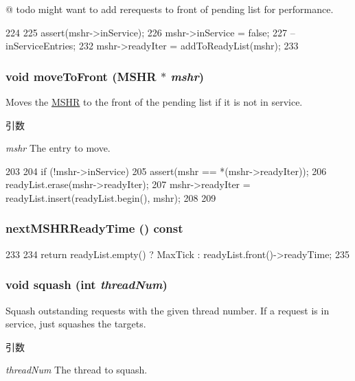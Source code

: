 @ todo might want to add rerequests to front of pending list for performance.


\begin{DoxyCode}
224 {
225     assert(mshr->inService);
226     mshr->inService = false;
227     --inServiceEntries;
232     mshr->readyIter = addToReadyList(mshr);
233 }
\end{DoxyCode}
\hypertarget{classMSHRQueue_a2a53c836e41157cdbf2c19b6fd30e276}{
\subsubsection[{moveToFront}]{\setlength{\rightskip}{0pt plus 5cm}void moveToFront ({\bf MSHR} $\ast$ {\em mshr})}}
\label{classMSHRQueue_a2a53c836e41157cdbf2c19b6fd30e276}
Moves the \hyperlink{classMSHR}{MSHR} to the front of the pending list if it is not in service. 
\begin{DoxyParams}{引数}
\item[{\em mshr}]The entry to move. \end{DoxyParams}



\begin{DoxyCode}
203 {
204     if (!mshr->inService) {
205         assert(mshr == *(mshr->readyIter));
206         readyList.erase(mshr->readyIter);
207         mshr->readyIter = readyList.insert(readyList.begin(), mshr);
208     }
209 }
\end{DoxyCode}
\hypertarget{classMSHRQueue_a4601a57ba7740776052541f212c29cbd}{
\subsubsection[{nextMSHRReadyTime}]{ nextMSHRReadyTime () const}}
\label{classMSHRQueue_a4601a57ba7740776052541f212c29cbd}



\begin{DoxyCode}
233     {
234         return readyList.empty() ? MaxTick : readyList.front()->readyTime;
235     }
\end{DoxyCode}
\hypertarget{classMSHRQueue_a94c2c174856cbab1e3478cb02ae8ed80}{
\subsubsection[{squash}]{\setlength{\rightskip}{0pt plus 5cm}void squash (int {\em threadNum})}}
\label{classMSHRQueue_a94c2c174856cbab1e3478cb02ae8ed80}
Squash outstanding requests with the given thread number. If a request is in service, just squashes the targets. 
\begin{DoxyParams}{引数}
\item[{\em threadNum}]The thread to squash. \end{DoxyParams}



